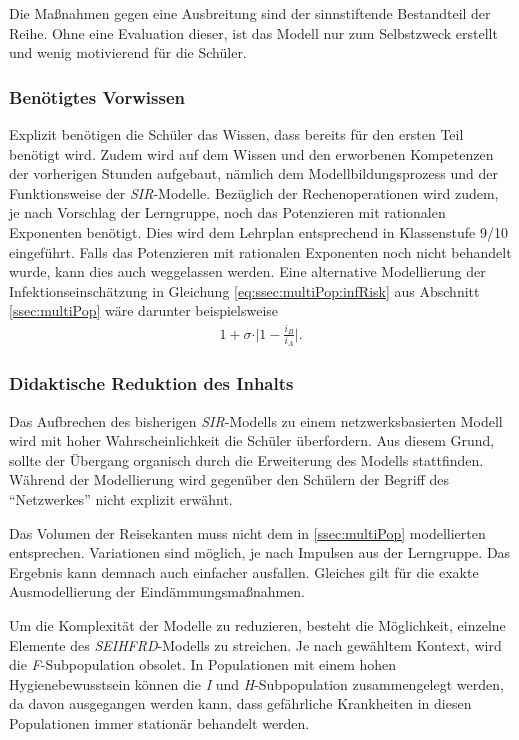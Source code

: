 Die Maßnahmen gegen eine Ausbreitung sind der sinnstiftende Bestandteil der Reihe. Ohne eine Evaluation dieser, ist das Modell nur zum Selbstzweck erstellt und wenig motivierend für die Schüler. 
\subsubsection*{Benötigtes Vorwissen}
Explizit benötigen die Schüler das Wissen, dass bereits für den ersten Teil benötigt wird. Zudem wird auf dem Wissen und den erworbenen Kompetenzen der vorherigen Stunden aufgebaut, nämlich dem Modellbildungsprozess und der Funktionsweise der \emph{SIR}-Modelle. Bezüglich der Rechenoperationen wird zudem, je nach Vorschlag der Lerngruppe, noch das Potenzieren mit rationalen Exponenten benötigt. Dies wird dem Lehrplan entsprechend in Klassenstufe 9/10 eingeführt. Falls das Potenzieren mit rationalen Exponenten noch nicht behandelt wurde, kann dies auch weggelassen werden. Eine alternative Modellierung der Infektionseinschätzung in Gleichung \ref{eq:ssec:multiPop:infRisk} aus Abschnitt \ref{ssec:multiPop} wäre darunter beispielsweise
\begin{align}
	1+\sigma\cdot \vert 1- \frac{i_B}{i_A}\vert.
\end{align}
\subsubsection*{Didaktische Reduktion des Inhalts}
Das Aufbrechen des bisherigen \emph{SIR}-Modells zu einem netzwerksbasierten Modell wird mit hoher Wahrscheinlichkeit die Schüler überfordern. Aus diesem Grund, sollte der Übergang organisch durch die Erweiterung des Modells stattfinden. Während der Modellierung wird gegenüber den Schülern der Begriff des ``Netzwerkes'' nicht explizit erwähnt.

Das Volumen der Reisekanten muss nicht dem in \ref{ssec:multiPop} modellierten entsprechen. Variationen sind möglich, je nach Impulsen aus der Lerngruppe. Das Ergebnis kann demnach auch einfacher ausfallen. Gleiches gilt für die exakte Ausmodellierung der Eindämmungsmaßnahmen. 

Um die Komplexität der Modelle zu reduzieren, besteht die Möglichkeit, einzelne Elemente des \emph{SEIHFRD}-Modells zu streichen. Je nach gewähltem Kontext, wird die \emph{F}-Subpopulation obsolet. In Populationen mit einem hohen Hygienebewusstsein können die \emph{I} und \emph{H}-Subpopulation zusammengelegt werden, da davon ausgegangen werden kann, dass gefährliche Krankheiten in diesen Populationen immer stationär behandelt werden. 
